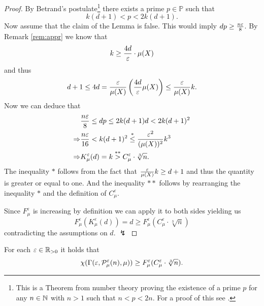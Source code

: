 \begin{proof}
  By Betrand's postulate\footnote{This is a Theorem from number theory proving the existence of a prime $p$ for any $n\in \N$ with $n>1$ such that $n < p < 2n$. For a proof of this see \cite{Chebyshev1852}.}
  there exists a prime $p \in \mathbb{P}$ such that \[k(d+1) < p < 2k(d+1).\]
  Now assume that the claim of the Lemma is false. This would imply $dp \geq {n\varepsilon \over 8}$. By Remark \ref{rem:appr} we know that \[k \geq {4d \over \varepsilon} \cdot \mu(X)\] and thus
  \begin{equation*}
    d+1 \leq 4d = {\varepsilon \over \mu(X)}\left({4d \over \varepsilon} \mu(X)\right)\leq {\varepsilon \over \mu(X)} k. 
  \end{equation*}
  Now we can deduce that
  \begin{align*}
    &{n\varepsilon \over 8} \leq dp \leq 2k(d+1)d < 2k(d+1)^2 \\
    \Rightarrow & {n\varepsilon \over 16} < k(d+1)^2 \overset{*}{\leq} {\varepsilon^2\over (\mu(X))^2}k^3 \\
    \Rightarrow & K_\mu^\varepsilon(d) = k \overset{**}{>} C_\mu^\varepsilon\cdot \sqrt[3]{n}.
  \end{align*}
  The inequality $*$ follows from the fact that ${\varepsilon \over \mu(X)}k \geq d+1$ and thus the quantity is greater or equal to one. And the inequality $**$ follows by rearranging the inequality $*$ and the definition of $C_\mu^\varepsilon$.

  Since $F_\mu^\varepsilon$ is increasing by definition we can apply it to both sides yielding us
  \begin{equation*}
    F_\mu^\varepsilon(K_\mu^\varepsilon(d)) = d \geq F_\mu^\varepsilon(C_\mu^\varepsilon\cdot\sqrt[3]{n})
  \end{equation*}
  contradicting the assumptions on $d$. $\lightning$
\end{proof}

\begin{thm}\label{thm:gammain}
  For each $\varepsilon \in \R_{>0}$ it holds that \[\chi(\Gamma(\varepsilon, \P^\varepsilon_\mu(n), \mu)) \geq F^\varepsilon_\mu(C^\varepsilon_\mu \cdot \sqrt[3]{n}).\]
\end{thm}

\newcommand{\h}{h_{m_q-1-q_0}}
\newcommand{\hh}{h_{m_q-q_0}}

